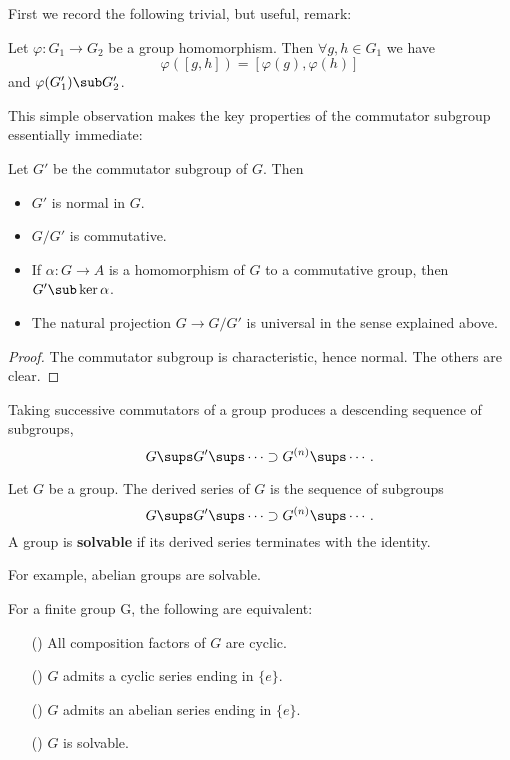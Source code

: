 First we record the following trivial, but useful, remark:
\begin{lemma}
Let $\varphi:G_1\to G_2$ be a group homomorphism. Then $\forall g,h\in G_1$ we have
\[\varphi([g,h])=[\varphi(g),\varphi(h)]\]
and $\varphi(G_1')\sub G_2'$.
\end{lemma}
This simple observation makes the key properties of the commutator subgroup essentially immediate:
\begin{proposition}\label{group commutator}
Let $G'$ be the commutator subgroup of $G$. Then
\begin{itemize}
\item $G'$ is normal in $G$.
\item $G/G'$ is commutative.
\item If $\alpha:G\to A$ is a homomorphism of $G$ to a commutative group, then $G'\sub\ker\alpha$.
\item The natural projection $G\to G/G'$ is universal in the sense explained above.
\end{itemize}
\end{proposition}
\begin{proof}
The commutator subgroup is characteristic, hence normal. The others are clear.
\end{proof}
Taking successive commutators of a group produces a descending sequence of subgroups,
\[G\sups G'\sups\cdots\supset G^{(n)}\sups\cdots.\]
\begin{definition}
Let $G$ be a group. The derived series of $G$ is the sequence of subgroups
\[G\sups G'\sups\cdots\supset G^{(n)}\sups\cdots.\]
A group is \textbf{solvable} if its derived series terminates with the identity.
\end{definition}
For example, abelian groups are solvable.
\begin{proposition}\label{group solvable iff}
For a finite group G, the following are equivalent:
\begin{itemize}
\item[(\rmnum{1})] All composition factors of $G$ are cyclic.
\item[(\rmnum{2})] $G$ admits a cyclic series ending in $\{e\}$.
\item[(\rmnum{3})] $G$ admits an abelian series ending in $\{e\}$.
\item[(\rmnum{4})] $G$ is solvable.
\end{itemize}
\end{proposition}
